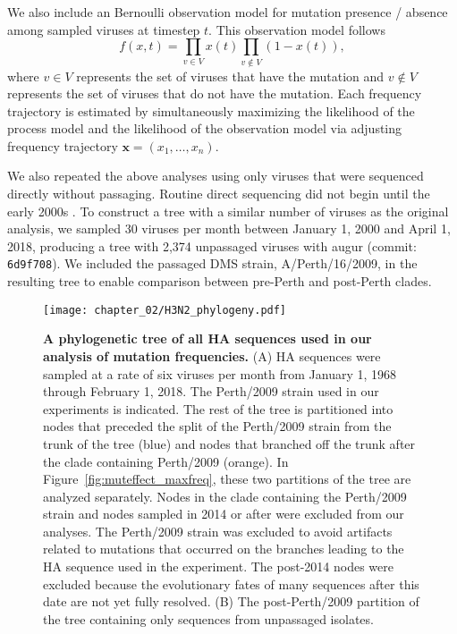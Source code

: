 We also include an Bernoulli observation model for mutation presence / absence among sampled viruses at timestep $t$.
This observation model follows
\begin{equation}
f(x,t) = \prod_{v\in V} x(t) \prod_{v\notin V} (1-x(t)),
\end{equation}
where $v\in V$ represents the set of viruses that have the mutation and $v\notin V$ represents the set of viruses that do not have the mutation.
Each frequency trajectory is estimated by simultaneously maximizing the likelihood of the process model and the likelihood of the observation model via adjusting frequency trajectory $\mathbf{x}=(x_1, \ldots, x_n)$.

We also repeated the above analyses using only viruses that were sequenced directly without passaging.
Routine direct sequencing did not begin until the early 2000s \citep{McWhite:2016fe}.
To construct a tree with a similar number of viruses as the original analysis, we sampled 30 viruses per month between January 1, 2000 and April 1, 2018, producing a tree with 2,374 unpassaged viruses with augur (commit: \texttt{6d9f708}).
We included the passaged DMS strain, A/Perth/16/2009, in the resulting tree to enable comparison between pre-Perth and post-Perth clades.

\begin{figure}
\centerline{\texttt{[image: chapter\_02/H3N2\_phylogeny.pdf]}}
\caption{\label{suppfig:tree}
{\bf A phylogenetic tree of all HA sequences used in our analysis of mutation frequencies.}
(A) HA sequences were sampled at a rate of six viruses per month from January 1, 1968 through February 1, 2018.
The Perth/2009 strain used in our experiments is indicated.
The rest of the tree is partitioned into nodes that preceded the split of the Perth/2009 strain from the trunk of the tree (blue) and nodes that branched off the trunk after the clade containing Perth/2009 (orange).
In Figure~\ref{fig:muteffect_maxfreq}, these two partitions of the tree are analyzed separately.
Nodes in the clade containing the Perth/2009 strain and nodes sampled in 2014 or after were excluded from our analyses.
The Perth/2009 strain was excluded to avoid artifacts related to mutations that occurred on the branches leading to the HA sequence used in the experiment.
The post-2014 nodes were excluded because the evolutionary fates of many sequences after this date are not yet fully resolved.
(B) The post-Perth/2009 partition of the tree containing only sequences from unpassaged isolates.
}
\end{figure}

